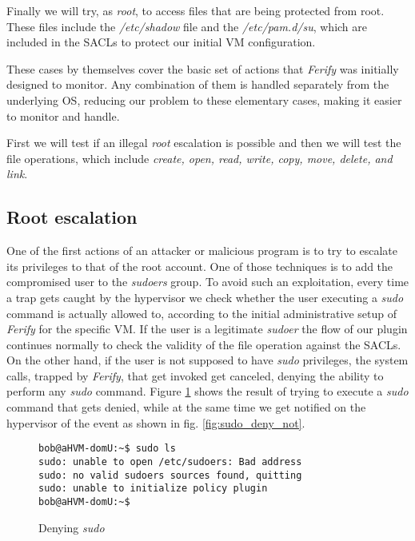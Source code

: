 \par Finally we will try, as \emph{root}, to access files that are being protected from root. These files include the \emph{/etc/shadow} file and the \emph{/etc/pam.d/su}, which are included in the \acp{SACL} to protect our initial \ac{VM} configuration.

\par These cases by themselves cover the basic set of actions that \emph{Ferify} was initially designed to monitor. Any combination of them is handled separately from the underlying \ac{OS}, reducing our problem to these elementary cases, making it easier to monitor and handle.

\par First we will test if an illegal \emph{root} escalation is possible and then we will test the file operations, which include \emph{create, open, read, write, copy, move, delete, and link}.

\subsection{Root escalation}

\par One of the first actions of an attacker or malicious program is to try to escalate its privileges to that of the root account. One of those techniques is to add the compromised user to the \emph{sudoers} group. To avoid such an exploitation, every time a trap gets caught by the hypervisor we check whether the user executing a \emph{sudo} command is actually allowed to, according to the initial administrative setup of \emph{Ferify} for the specific \ac{VM}. If the user is a legitimate \emph{sudoer} the flow of our plugin continues normally to check the validity of the file operation against the \acp{SACL}. On the other hand, if the user is not supposed to have \emph{sudo} privileges, the system calls, trapped by \emph{Ferify}, that get invoked get canceled, denying the ability to perform any \emph{sudo} command. Figure \ref{fig:sudo_deny} shows the result of trying to execute a \emph{sudo} command that gets denied, while at the same time we get notified on the hypervisor of the event as shown in fig. \ref{fig:sudo_deny_not}.

\begin{figure}[ht]
	\centering
	\footnotesize{\selectfont 
		\begin{lstlisting}
bob@aHVM-domU:~$ sudo ls
sudo: unable to open /etc/sudoers: Bad address
sudo: no valid sudoers sources found, quitting
sudo: unable to initialize policy plugin
bob@aHVM-domU:~$
		\end{lstlisting}}
	\caption{Denying \emph{sudo}}
	\label{fig:sudo_deny}
\end{figure}

